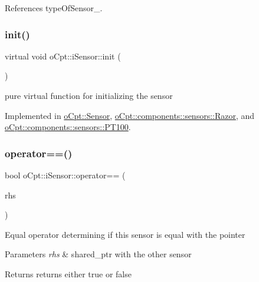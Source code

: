 References type\+Of\+Sensor\+\_\+.

\hypertarget{classo_cpt_1_1i_sensor_aa8def4a41b8280f7e4e02285cd7bd734}{}\label{classo_cpt_1_1i_sensor_aa8def4a41b8280f7e4e02285cd7bd734} 
\subsubsection{\texorpdfstring{init()}{init()}}
{\footnotesize\ttfamily virtual void o\+Cpt\+::i\+Sensor\+::init (\begin{DoxyParamCaption}{ }\end{DoxyParamCaption})\hspace{0.3cm}{\ttfamily [pure virtual]}}

pure virtual function for initializing the sensor 

Implemented in \hyperlink{classo_cpt_1_1_sensor_aa612a305a9a3091dd62cd1afb9d4dd7d}{o\+Cpt\+::\+Sensor}, \hyperlink{classo_cpt_1_1components_1_1sensors_1_1_razor_a1dd2b5a9fbac3c9510e2d3771abf358b}{o\+Cpt\+::components\+::sensors\+::\+Razor}, and \hyperlink{classo_cpt_1_1components_1_1sensors_1_1_p_t100_a296d0c3c2a55df465e127462c8c30215}{o\+Cpt\+::components\+::sensors\+::\+P\+T100}.

\hypertarget{classo_cpt_1_1i_sensor_affc8319846828aac6cab641f294a04aa}{}\label{classo_cpt_1_1i_sensor_affc8319846828aac6cab641f294a04aa} 
\subsubsection{\texorpdfstring{operator==()}{operator==()}}
{\footnotesize\ttfamily bool o\+Cpt\+::i\+Sensor\+::operator== (\begin{DoxyParamCaption}\item[{\hyperlink{classo_cpt_1_1i_sensor_a03533d2c5dc66e332d70dbb3b5e3006a}{i\+Sensor\+::ptr}}]{rhs }\end{DoxyParamCaption})\hspace{0.3cm}{\ttfamily [virtual]}}

Equal operator determining if this sensor is equal with the pointer 
\begin{DoxyParams}{Parameters}
{\em rhs} & shared\+\_\+ptr with the other sensor \\
\hline
\end{DoxyParams}
\begin{DoxyReturn}{Returns}
returns either true or false 
\end{DoxyReturn}


